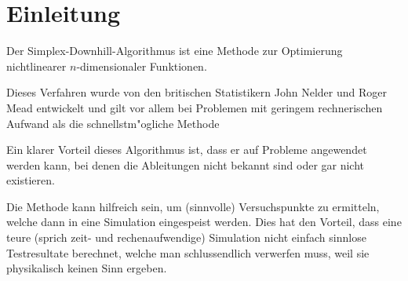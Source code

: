 \section{Einleitung}
Der Simplex-Downhill-Algorithmus ist eine Methode zur Optimierung
nichtlinearer $n$-dimen\-sionaler Funktionen.

Dieses Verfahren wurde von den britischen Statistikern John Nelder und
Roger Mead entwickelt und gilt vor allem bei Problemen mit geringem
rechnerischen Aufwand als die schnellstm"ogliche Methode
\cite{bib:link2}

Ein  klarer Vorteil dieses Algorithmus ist, dass er auf Probleme
angewendet werden kann, bei denen  die Ableitungen nicht bekannt sind
oder gar nicht existieren.

Die Methode kann hilfreich sein, um (sinnvolle) Versuchspunkte zu
ermitteln, welche dann in eine Simulation eingespeist werden.
Dies hat den Vorteil, dass eine teure (sprich zeit- und rechenaufwendige)
Simulation nicht einfach sinnlose Testresultate berechnet, welche man
schlussendlich verwerfen muss, weil sie physikalisch keinen Sinn ergeben.
